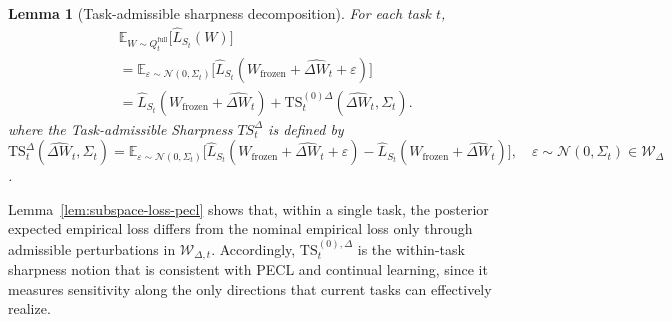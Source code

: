 \documentclass{article}
\theoremstyle{plain}
\newtheorem{lemma}[theorem]{Lemma}
\theoremstyle{definition}
\theoremstyle{remark}
\begin{document}
\begin{lemma}[Task-admissible sharpness decomposition]
\label{lem:subspace-loss-pecl}
For each task $t$,
\begin{equation*}
\label{eq:subspace-loss-pecl}
\begin{aligned}
&\mathbb E_{W\sim Q_t^{\mathrm{full}}}\bigl[\hat L_{S_t}(W)\bigr] \\
&= \mathbb{E}_{\varepsilon\sim\mathcal N(0,\Sigma_t)}
    \big[\hat{L}_{S_t}(W_\mathrm {frozen }+\hat{\Delta W}_t+\varepsilon)\big] \\
& =\hat L_{S_t}(W_{\mathrm{frozen}} + \hat{\Delta W}_t)
+
\mathrm{TS}_t^{(0)\Delta}(\hat{\Delta W}_t,\Sigma_t).
\end{aligned}
\end{equation*}
where the \emph{Task-admissible Sharpness} $TS_t^{\Delta}$ is defined by $
\mathrm{TS}_t^{\Delta}(\hat{\Delta W}_t,\Sigma_t)
= \mathbb{E}_{\varepsilon\sim\mathcal N(0,\Sigma_t)}
   \big[\hat{L}_{S_t}(W_\mathrm {frozen }+\hat{\Delta W}_t+\varepsilon)
       - \hat{L}_{S_t}(W_\mathrm {frozen }+\hat{\Delta W}_t)\big],\quad
\varepsilon\sim\mathcal N(0,\Sigma_t) \in  \mathcal W_\Delta$.
\end{lemma}
Lemma~\eqref{lem:subspace-loss-pecl} shows that, within a single task, the posterior expected empirical loss differs from the nominal empirical loss only through admissible perturbations in $\mathcal W_{\Delta,t}$.
Accordingly, $\mathrm{TS}_t^{(0),\Delta}$ is the within-task sharpness notion that is consistent with PECL and continual learning, since it measures sensitivity along the only directions that current tasks can effectively realize.


\end{document}
